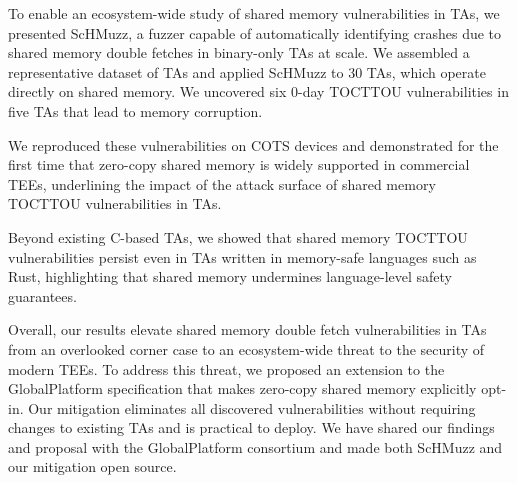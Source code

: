 \documentclass[conference]{IEEEtran}
\newcommand{\sysname}{ScHMuzz\xspace}
\newcommand{\optee}{OP-TEE\xspace}
\newcommand{\numTAs}{66\xspace}
\newcommand{\numTAsharnessed}{30\xspace}
\newcommand{\numdfsmerge}{17,232\xspace}
\newcommand{\numvulns}{six\xspace}
\newcommand{\numvulnTAs}{five\xspace}
\begin{document}
To enable an ecosystem-wide study of shared memory vulnerabilities in TAs, we 
presented \sysname, a fuzzer capable of automatically 
identifying crashes due to shared memory double fetches in binary-only TAs at scale. 
We assembled a representative dataset of TAs and applied \sysname to \numTAsharnessed{} TAs, 
which operate directly on shared memory. 
We uncovered \numvulns{} 0-day TOCTTOU vulnerabilities 
in \numvulnTAs{} TAs that lead to memory corruption. 

We reproduced these vulnerabilities 
on COTS devices and demonstrated for the first time that zero-copy shared memory is 
widely supported in commercial TEEs, underlining the impact of the attack surface of 
shared memory TOCTTOU vulnerabilities in TAs.  

Beyond existing C-based TAs, we showed that shared memory TOCTTOU vulnerabilities persist even in 
TAs written in memory-safe languages such as Rust, highlighting that shared memory undermines 
language-level safety guarantees. 

Overall, our results elevate shared memory double fetch vulnerabilities in TAs 
from an overlooked corner case to an ecosystem-wide threat to the security of modern TEEs.
To address this threat, we proposed an extension 
to the GlobalPlatform specification that makes zero-copy shared memory explicitly opt-in. 
Our mitigation eliminates all discovered vulnerabilities without requiring changes to existing 
TAs and is practical to deploy. We have shared our findings and proposal with the GlobalPlatform 
consortium and made both \sysname and our mitigation open source.

%
 
\end{document}
